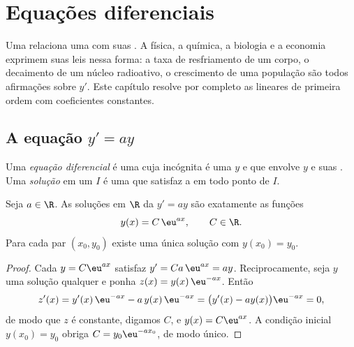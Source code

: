 \chapter{Equações diferenciais}\label{ch:g12:diffeq}

Uma  relaciona uma  com suas . A física,
a química, a biologia e a economia exprimem suas leis nessa forma: a taxa
de resfriamento de um corpo, o decaimento de um núcleo radioativo, o
crescimento de uma população são todos afirmações sobre $y'$. Este
capítulo resolve por completo as  lineares de primeira ordem com
coeficientes constantes.

\section{A equação \texorpdfstring{$y' = ay$}{y' = ay}}

\begin{definition}\label{def:g12:diffeq:ode}
Uma \emph{equação diferencial} é uma 
cuja incógnita é uma  $y$ e que envolve $y$ e suas . Uma
\emph{solução} em um  $I$ é uma   que satisfaz a
 em todo ponto de $I$.
\end{definition}

\begin{theorem}[Soluções de $y' = ay$]\label{thm:g12:diffeq:homogeneous}
Seja $a \in \R$. As soluções em $\R$ da  $y' = ay$ são exatamente as
funções
\[
y(x) = C\,\eu^{ax}, \qquad C \in \R .
\]
Para cada par $(x_0, y_0)$ existe uma única solução com $y(x_0) = y_0$.
\end{theorem}

\begin{proof}
Cada $y = C\eu^{ax}$ satisfaz $y' = Ca\,\eu^{ax} = ay$. Reciprocamente,
seja $y$ uma solução qualquer e ponha $z(x) = y(x)\,\eu^{-ax}$. Então
\[
z'(x) = y'(x)\,\eu^{-ax} - a\,y(x)\,\eu^{-ax}
= \bigl(y'(x) - a y(x)\bigr)\eu^{-ax} = 0,
\]
de modo que $z$ é constante, digamos $C$, e $y(x) = C\eu^{ax}$. A condição
inicial $y(x_0) = y_0$ obriga $C = y_0 \eu^{-a x_0}$, de modo único.
\end{proof}

